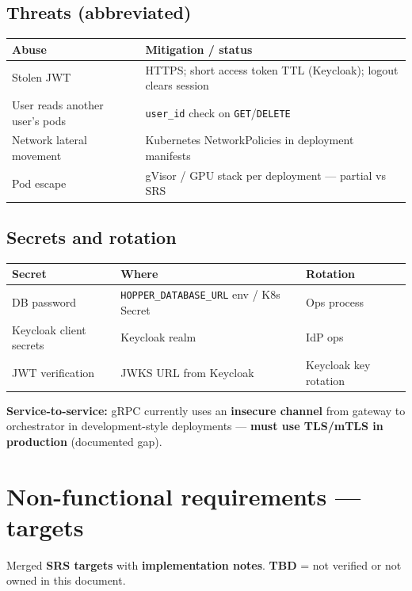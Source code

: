 \documentclass[12pt,a4paper]{article}
\begin{document}
\subsection{Threats (abbreviated)}
\begin{tabularx}{\textwidth}{@{}L{4cm} X@{}}
  \toprule
  \textbf{Abuse} & \textbf{Mitigation / status} \\
  \midrule
  Stolen JWT & HTTPS; short access token TTL (Keycloak); logout clears session \\
  User reads another user's pods & \texttt{user\_id} check on \texttt{GET}/\texttt{DELETE} \\
  Network lateral movement & Kubernetes NetworkPolicies in deployment manifests \\
  Pod escape & gVisor / GPU stack per deployment --- partial vs SRS \\
  \bottomrule
\end{tabularx}

\subsection{Secrets and rotation}
\begin{tabularx}{\textwidth}{@{}L{3.2cm} L{3.5cm} X@{}}
  \toprule
  \textbf{Secret} & \textbf{Where} & \textbf{Rotation} \\
  \midrule
  DB password & \texttt{HOPPER\_DATABASE\_URL} env / K8s Secret & Ops process \\
  Keycloak client secrets & Keycloak realm & IdP ops \\
  JWT verification & JWKS URL from Keycloak & Keycloak key rotation \\
  \bottomrule
\end{tabularx}

\vspace{0.5em}
\noindent\textbf{Service-to-service:} gRPC currently uses an \textbf{insecure channel} from gateway to orchestrator in development-style deployments --- \textbf{must use TLS/mTLS in production} (documented gap).

\section{Non-functional requirements --- targets}
\label{app:nfr-targets}

Merged \textbf{SRS targets} with \textbf{implementation notes}. \textbf{TBD} = not verified or not owned in this document.
\end{document}
